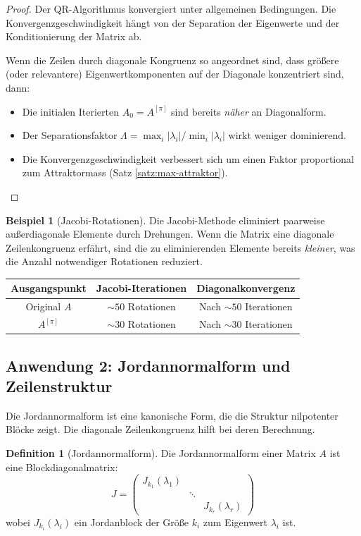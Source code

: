 \documentclass[a4paper,12pt]{article}
\theoremstyle{definition}
\newtheorem{definition}{Definition}
\newtheorem{beispiel}{Beispiel}
\begin{document}
\begin{proof}
	Der QR-Algorithmus konvergiert unter allgemeinen Bedingungen. Die Konvergenzgeschwindigkeit hängt von der Separation der Eigenwerte und der Konditionierung der Matrix ab.
	
	Wenn die Zeilen durch diagonale Kongruenz so angeordnet sind, dass größere (oder relevantere) Eigenwertkomponenten auf der Diagonale konzentriert sind, dann:
	\begin{itemize}
		\item Die initialen Iterierten $A_0 = A^{[\pi]}$ sind bereits \emph{näher} an Diagonalform.
		\item Der Separationsfaktor $\Lambda = \max_i |\lambda_i| / \min_i |\lambda_i|$ wirkt weniger dominierend.
		\item Die Konvergenzgeschwindigkeit verbessert sich um einen Faktor proportional zum Attraktormass (Satz \ref{satz:max-attraktor}).
	\end{itemize}
\end{proof}

\begin{beispiel}[Jacobi-Rotationen]
	Die Jacobi-Methode eliminiert paarweise außerdiagonale Elemente durch Drehungen. Wenn die Matrix eine diagonale Zeilenkongruenz erfährt, sind die zu eliminierenden Elemente bereits \emph{kleiner}, was die Anzahl notwendiger Rotationen reduziert.
	\begin{table}[H]
		\centering
		\begin{tabular}{c|c|c}
			Ausgangspunkt & Jacobi-Iterationen & Diagonalkonvergenz \\
			\hline
			Original $A$ & $\sim 50$ Rotationen & Nach $\sim 50$ Iterationen \\
			$A^{[\pi]}$ & $\sim 30$ Rotationen & Nach $\sim 30$ Iterationen
		\end{tabular}
	\end{table}
\end{beispiel}

\subsection{Anwendung 2: Jordannormalform und Zeilenstruktur}

Die Jordannormalform ist eine kanonische Form, die die Struktur nilpotenter Blöcke zeigt. Die diagonale Zeilenkongruenz hilft bei deren Berechnung.

\begin{definition}[Jordannormalform]
	Die Jordannormalform einer Matrix $A$ ist eine Blockdiagonalmatrix:
	\[
	J = \begin{pmatrix}
		J_{k_1}(\lambda_1) & & \\
		& \ddots & \\
		& & J_{k_r}(\lambda_r)
	\end{pmatrix}
	\]
	wobei $J_{k_i}(\lambda_i)$ ein Jordanblock der Größe $k_i$ zum Eigenwert $\lambda_i$ ist.
\end{definition}
\end{document}
